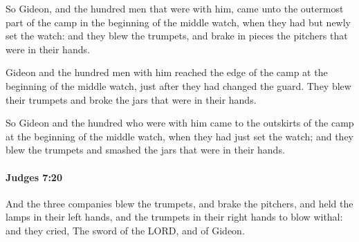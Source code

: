 			\begin{versebox}
					\item[BHS] 
					\item[ASV] So Gideon, and the hundred men that were with him, came unto the outermost part of the camp in the beginning of the middle watch, when they had but newly set the watch: and they blew the trumpets, and brake in pieces the pitchers that were in their hands.
					\item[NIV] Gideon and the hundred men with him reached the edge of the camp at the beginning of the middle watch, just after they had changed the guard. They blew their trumpets and broke the jars that were in their hands.
					\item[NRSV] So Gideon and the hundred who were with him came to the outskirts of the camp at the beginning of the middle watch, when they had just set the watch; and they blew the trumpets and smashed the jars that were in their hands.
			\end{versebox}

		\paragraph{Judges 7:20} %
			\label{JUDGES-7-20}

			And the three companies blew the trumpets, and brake the pitchers, and held the lamps in their left hands, and the trumpets in their right hands to blow withal: and they cried, The sword of the LORD, and of Gideon.

